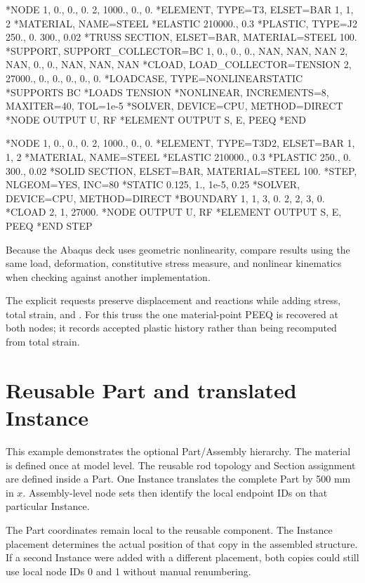 \begin{dialectexamples}
\begin{femasterdeck}
*NODE
1,    0., 0., 0.
2, 1000., 0., 0.
*ELEMENT, TYPE=T3, ELSET=BAR
1, 1, 2
*MATERIAL, NAME=STEEL
*ELASTIC
210000., 0.3
*PLASTIC, TYPE=J2
250., 0.
300., 0.02
*TRUSS SECTION, ELSET=BAR,
 MATERIAL=STEEL
100.
*SUPPORT, SUPPORT_COLLECTOR=BC
1, 0., 0., 0., NAN, NAN, NAN
2, NAN, 0., 0., NAN, NAN, NAN
*CLOAD, LOAD_COLLECTOR=TENSION
2, 27000., 0., 0., 0., 0., 0.
*LOADCASE, TYPE=NONLINEARSTATIC
*SUPPORTS
BC
*LOADS
TENSION
*NONLINEAR, INCREMENTS=8,
 MAXITER=40, TOL=1e-5
*SOLVER, DEVICE=CPU, METHOD=DIRECT
*NODE OUTPUT
U, RF
*ELEMENT OUTPUT
S, E, PEEQ
*END
\end{femasterdeck}
\begin{abaqusdeck}
*NODE
1,    0., 0., 0.
2, 1000., 0., 0.
*ELEMENT, TYPE=T3D2, ELSET=BAR
1, 1, 2
*MATERIAL, NAME=STEEL
*ELASTIC
210000., 0.3
*PLASTIC
250., 0.
300., 0.02
*SOLID SECTION, ELSET=BAR,
 MATERIAL=STEEL
100.
*STEP, NLGEOM=YES, INC=80
*STATIC
0.125, 1., 1e-5, 0.25
*SOLVER, DEVICE=CPU, METHOD=DIRECT
*BOUNDARY
1, 1, 3, 0.
2, 2, 3, 0.
*CLOAD
2, 1, 27000.
*NODE OUTPUT
U, RF
*ELEMENT OUTPUT
S, E, PEEQ
*END STEP
\end{abaqusdeck}
\end{dialectexamples}

Because the Abaqus deck uses geometric nonlinearity, compare results using the same load, deformation, constitutive stress measure, and nonlinear kinematics when checking against another implementation.

The explicit requests preserve displacement and reactions while adding stress, total strain, and . For this truss the one material-point PEEQ is recovered at both nodes; it records accepted plastic history rather than being recomputed from total strain.

\section{Reusable Part and translated Instance}

This example demonstrates the optional Part/Assembly hierarchy. The material is defined once at model level. The reusable rod topology and Section assignment are defined inside a Part. One Instance translates the complete Part by 500 mm in \(x\). Assembly-level node sets then identify the local endpoint IDs on that particular Instance.

The Part coordinates remain local to the reusable component. The Instance placement determines the actual position of that copy in the assembled structure. If a second Instance were added with a different placement, both copies could still use local node IDs 0 and 1 without manual renumbering.

